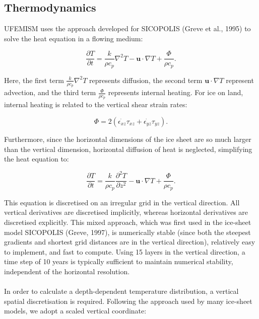 \documentclass{article}
\begin{document}
\subsection{Thermodynamics}

UFEMISM uses the approach developed for SICOPOLIS (Greve et al., 1995) to solve the heat equation in a flowing medium:

\begin{equation}
\frac{\partial T}{\partial t} = \frac{k}{\rho c_p} \nabla^2 T - \mathbf{u} \cdot \nabla T + \frac{\Phi}{\rho c_p}.
\end{equation}

Here, the first term $\frac{k}{\rho c_p} \nabla^2 T$ represents diffusion, the second term $\mathbf{u} \cdot \nabla T$ represent advection, and the third term $\frac{\Phi}{\rho c_p}$ represents internal heating. For ice on land, internal heating is related to the vertical shear strain rates:

\begin{equation}
\Phi = 2 \left( \dot{\epsilon_{xz}} \tau_{xz} + \dot{\epsilon_{yz}} \tau_{yz} \right).
\end{equation}

Furthermore, since the horizontal dimensions of the ice sheet are so much larger than the vertical dimension, horizontal diffusion of heat is neglected, simplifying the heat equation to:

\begin{equation}
\frac{\partial T}{\partial t} = \frac{k}{\rho c_p} \frac{\partial^2 T}{\partial z^2} - \mathbf{u} \cdot \nabla T + \frac{\Phi}{\rho c_p}.
\end{equation}

This equation is discretised on an irregular grid in the vertical direction. All vertical derivatives are discretised implicitly, whereas horizontal derivatives are discretised explicitly. This mixed approach, which was first used in the ice-sheet model SICOPOLIS (Greve, 1997), is numerically stable (since both the steepest gradients and shortest grid distances are in the vertical direction), relatively easy to implement, and fast to compute. Using 15 layers in the vertical direction, a time step of 10 years is typically sufficient to maintain numerical stability, independent of the horizontal resolution.\\
\\
In order to calculate a depth-dependent temperature distribution, a vertical spatial discretisation is required. Following the approach used by many ice-sheet models, we adopt a scaled vertical coordinate:
\end{document}
